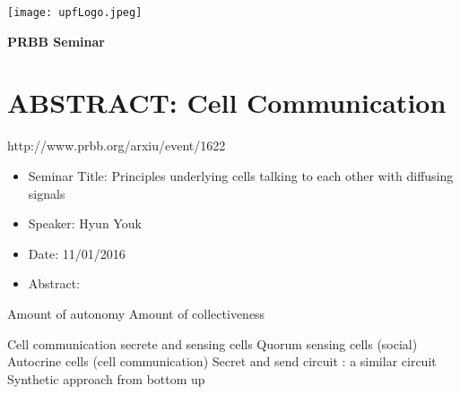 \documentclass[10pt,letterpaper]{article}
\begin{document}
\vspace{-1cm}
\hspace{-1cm}
\begin{minipage}{.5\textwidth}
    \noindent \texttt{[image: upfLogo.jpeg]} 
\end{minipage}
\hfill
\begin{minipage}{.5\textwidth}
    \flushright
    \textbf{ \Large PRBB Seminar}
\end{minipage}

\vspace{3cm}

\hspace{-1cm}
\vspace{2cm}

\section{ABSTRACT: Cell Communication}
http://www.prbb.org/arxiu/event/1622
\begin{itemize}
    \item Seminar Title: Principles underlying cells talking to each other with diffusing signals
    \item Speaker: Hyun Youk
    \item Date: 11/01/2016
    \item Abstract:
\end{itemize}


Amount of autonomy
Amount of collectiveness

Cell communication secrete and sensing cells
Quorum sensing cells (social)
Autocrine cells (cell communication)
Secret and send circuit : a similar circuit
Synthetic approach from bottom up
\end{document}
